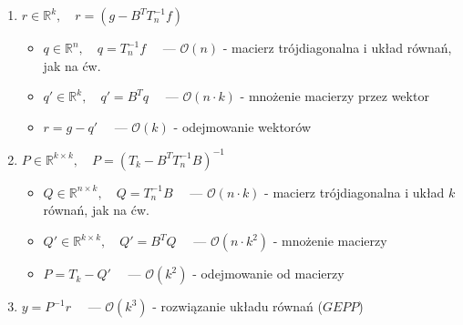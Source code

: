 \documentclass[a4paper]{article}
\newcommand{\R}{\mathbb R} %
\begin{document}
        \begin{enumerate}
            \item
                $r \in \R^{k}, \quad r = (g - B^{T}T_{n}^{-1}f)$

                \begin{itemize}
                    \item
                        $q \in \R^{n}, \quad q = T_{n}^{-1}f \quad$ ---
                        $\mathcal{O}(n)$ - macierz trójdiagonalna i układ równań, jak na ćw.

                    \item
                        $q' \in \R^{k}, \quad q' = B^{T}q \quad$ ---
                        $\mathcal{O}(n \cdot k)$ - mnożenie macierzy przez wektor

                    \item
                        $r = g - q' \quad$ ---
                        $\mathcal{O}(k)$ - odejmowanie wektorów

                \end{itemize}

            \item
                 $P \in \R^{k \times k}, \quad P = (T_{k} - B^{T}T_{n}^{-1}B)^{-1}$

                \begin{itemize}
                    \item
                        $Q \in \R^{n \times k}, \quad Q = T_{n}^{-1}B \quad$ ---
                        $\mathcal{O}(n \cdot k)$ - macierz trójdiagonalna i układ $k$ równań, jak na ćw.

                    \item
                        $Q' \in \R^{k \times k}, \quad Q' = B^{T}Q \quad$ ---
                        $\mathcal{O}(n \cdot k^{2})$ - mnożenie macierzy

                    \item
                        $P = T_{k} - Q' \quad$ ---
                        $\mathcal{O}(k^{2})$ - odejmowanie od macierzy

                \end{itemize}

            \item
                $y = P^{-1}r \quad$ ---
                $\mathcal{O}(k^{3})$ - rozwiązanie układu równań ($GEPP$)

        \end{enumerate}
\end{document}
